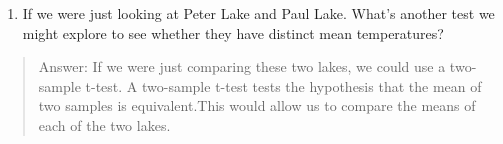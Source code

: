 \documentclass[
]{article}
\providecommand{\tightlist}{%
  \setlength{\itemsep}{0pt}\setlength{\parskip}{0pt}}
\begin{document}
\begin{enumerate}
\def\labelenumi{\arabic{enumi}.}
\setcounter{enumi}{16}
\tightlist
\item
  If we were just looking at Peter Lake and Paul Lake. What's another
  test we might explore to see whether they have distinct mean
  temperatures?
\end{enumerate}

\begin{quote}
Answer: If we were just comparing these two lakes, we could use a
two-sample t-test. A two-sample t-test tests the hypothesis that the
mean of two samples is equivalent.This would allow us to compare the
means of each of the two lakes.
\end{quote}
\end{document}
